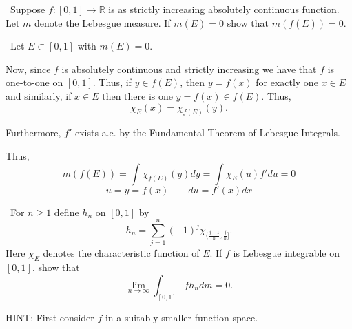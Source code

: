 \documentclass[12pt]{Qual}
\begin{document}
\begin{problem} $\,$
Suppose $f:[0,1]\to\mathbb{R}$ is as strictly increasing absolutely continuous function. Let $m$ denote the Lebesgue measure. If $m(E)=0$ show that $m(f(E))=0$.
\end{problem}


\begin{solution}$\,$
Let $E\subset[0,1]$ with $m(E)=0.$

Now, since $f$ is absolutely continuous and strictly increasing we have that $f$ is one-to-one on $[0,1]$. Thus, if $y\in f(E)$, then $y=f(x)$ for exactly one $x\in E$ and similarly, if $x\in E$ then there is one $y=f(x)\in f(E).$ Thus, $$\chi_E(x)=\chi_{f(E)}(y).$$

Furthermore, $f'$ exists a.e. by the Fundamental Theorem of Lebesgue Integrals.

Thus, $$m(f(E))=\int\chi_{f(E)}(y)dy=\int\chi_E(u)f'du=0$$ $$u=y=f(x)\qquad du=f'(x)dx$$
\end{solution}
\newpage

\begin{problem} $\,$
For $n\ge1$ define $h_n$ on $[0,1]$ by $$h_n=\sum_{j=1}^n(-1)^j\chi_{(\frac{j-1}{n},\frac{j}{n}]}.$$ Here $\chi_E$ denotes the characteristic function of $E$. If $f$ is Lebesgue integrable on $[0,1]$, show that $$\lim_{n\to\infty}\int_{[0,1]}fh_ndm=0.$$

HINT: First consider $f$ in a suitably smaller function space.
\end{problem}
\end{document}
